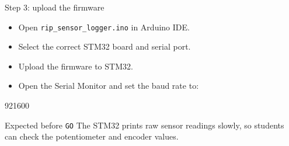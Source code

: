 \documentclass[aspectratio=169]{beamer}
\begin{document}
\begin{frame}{Step 3: upload the firmware}

\begin{itemize}
    \item Open \texttt{rip\_sensor\_logger.ino} in Arduino IDE.
    \vspace{0.3cm}

    \item Select the correct STM32 board and serial port.
    \vspace{0.3cm}

    \item Upload the firmware to STM32.
    \vspace{0.3cm}

    \item Open the Serial Monitor and set the baud rate to:
\end{itemize}

\vspace{0.15cm}

\begin{center}
\Large
\textcolor{PKUDarkPurple}{921600}
\end{center}

\vspace{0.15cm}

\begin{block}{Expected before \texttt{GO}}
\small
The STM32 prints raw sensor readings slowly, so students can check the potentiometer and encoder values.
\end{block}

\end{frame}
\end{document}
